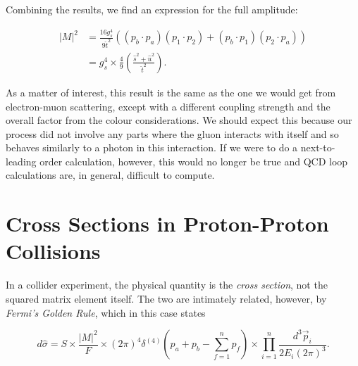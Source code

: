 Combining the results, we find an expression for the full amplitude:

\begin{equation}
\begin{split}
|M|^2 &= \frac{16 g_s^4}{9 \hat{t}^2} \left((p_b \cdot p_a)(p_1 \cdot p_2) + (p_b \cdot p_1)(p_2 \cdot p_a) \right) \\
&= g_s^4 \times \frac{4}{9} \left(\frac{\hat{s}^2 + \hat{u}^2}{\hat{t}^2} \right).
\end{split}
\label{eqn:qQ_qQ_LO}
\end{equation}

As a matter of interest, this result is the same as the one we would get from electron-muon scattering, except with a different coupling strength and the overall factor from the colour considerations. We should expect this because our process did not involve any parts where the gluon interacts with itself and so behaves similarly to a photon in this interaction. If we were to do a next-to-leading order calculation, however, this would no longer be true and QCD loop calculations are, in general, difficult to compute.

\section{Cross Sections in Proton-Proton Collisions}

In a collider experiment, the physical quantity is the \emph{cross section}, not the squared matrix element itself. The two are intimately related, however, by \emph{Fermi's Golden Rule}, which in this case states

\begin{equation}
d \hat{\sigma} = S \times \frac{|M|^2}{F} \times (2 \pi)^4 \delta^{(4)}(p_a + p_b - \sum_{f=1}^n p_f) \times \prod_{i=1}^n \frac{d^3 \vec{p}_i}{2 E_i (2 \pi)^3}.
\end{equation}

